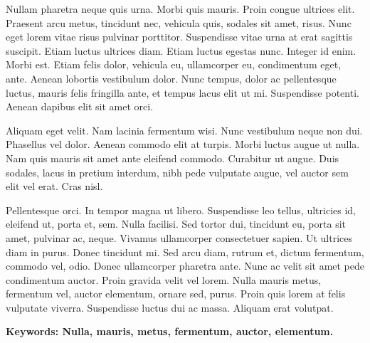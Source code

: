 \abstract

Nullam pharetra neque quis urna. Morbi quis mauris. Proin congue
ultrices elit. Praesent arcu metus, tincidunt nec, vehicula quis,
sodales sit amet, risus. Nunc eget lorem vitae risus pulvinar
porttitor. Suspendisse vitae urna at erat sagittis suscipit. Etiam
luctus ultrices diam. Etiam luctus egestas nunc. Integer id enim.
Morbi est. Etiam felis dolor, vehicula eu, ullamcorper eu,
condimentum eget, ante. Aenean lobortis vestibulum dolor. Nunc
tempus, dolor ac pellentesque luctus, mauris felis fringilla ante,
et tempus lacus elit ut mi. Suspendisse potenti. Aenean dapibus
elit sit amet orci.

Aliquam eget velit. Nam lacinia fermentum wisi. Nunc vestibulum
neque non dui. Phasellus vel dolor. Aenean commodo elit at turpis.
Morbi luctus augue ut nulla. Nam quis mauris sit amet ante
eleifend commodo. Curabitur ut augue. Duis sodales, lacus in
pretium interdum, nibh pede vulputate augue, vel auctor sem elit
vel erat. Cras nisl.

Pellentesque orci. In tempor magna ut libero. Suspendisse leo
tellus, ultricies id, eleifend ut, porta et, sem. Nulla facilisi.
Sed tortor dui, tincidunt eu, porta sit amet, pulvinar ac, neque.
Vivamus ullamcorper consectetuer sapien. Ut ultrices diam in
purus. Donec tincidunt mi. Sed arcu diam, rutrum et, dictum
fermentum, commodo vel, odio. Donec ullamcorper pharetra ante.
Nunc ac velit sit amet pede condimentum auctor. Proin gravida
velit vel lorem. Nulla mauris metus, fermentum vel, auctor
elementum, ornare sed, purus. Proin quis lorem at felis vulputate
viverra. Suspendisse luctus dui ac massa. Aliquam erat volutpat.



{\bfseries Keywords: Nulla, mauris, metus, fermentum, auctor,
elementum.}
